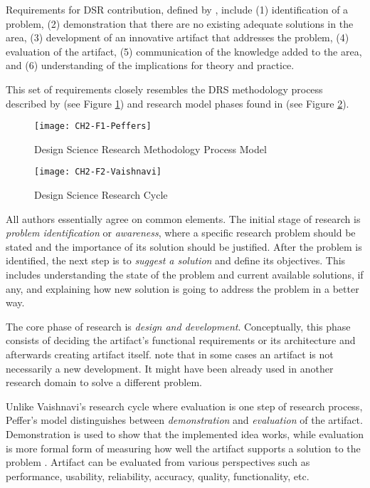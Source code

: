 Requirements for DSR contribution, defined by \citet{March2008}, include (1)
identification of a problem, (2) demonstration that there are no existing
adequate solutions in the area, (3) development of an innovative artifact that
addresses the problem, (4) evaluation of the artifact, (5) communication of the
knowledge added to the area, and (6) understanding of the implications for
theory and practice.

This set of requirements closely resembles the DRS methodology process described
by \citet{Peffers2008} (see Figure \ref{fig:peffers}) and research model phases
found in \citet{Vaishnavi2007} (see Figure \ref{fig:vaishnavi}).

\begin{figure}[h!]
\centering
\texttt{[image: CH2-F1-Peffers]}
\caption[Design Science Research Methodology Process Model]{Design Science
Research Methodology Process Model \citep{Peffers2008}}
\label{fig:peffers}
\end{figure}

\FloatBarrier

\begin{figure}[htp]
\centering
\texttt{[image: CH2-F2-Vaishnavi]}
\caption[Design Science Reseach Cycle]{Design Science Research Cycle
\citep{Vaishnavi2007}}
\label{fig:vaishnavi}
\end{figure}

All authors essentially agree on common elements. The initial stage of research
is \textit{problem identification} or \textit{awareness}, where a specific
research problem should be stated and the importance of its solution should be
justified. After the problem is identified, the next step is to \textit{suggest
a solution} and define its objectives. This includes understanding the state of
the problem and current available solutions, if any, and explaining how new
solution is going to address the problem in a better way. 

\FloatBarrier

The core phase of research is \textit{design and development}. Conceptually,
this phase consists of deciding the artifact's functional requirements or its
architecture and afterwards creating artifact itself. \citet{Peffers2008} note
that in some cases an artifact is not necessarily a new development. It might
have been already used in another research domain to solve a different problem.

Unlike Vaishnavi's research cycle where evaluation is one step of research
process, Peffer's model distinguishes between \textit{demonstration} and
\textit{evaluation} of the artifact. Demonstration is used to show that the
implemented idea works, while evaluation is more formal form of measuring how
well the artifact supports a solution to the problem \citep{Peffers2008}.
Artifact can be evaluated from various perspectives such as performance,
usability, reliability, accuracy, quality, functionality, etc.

